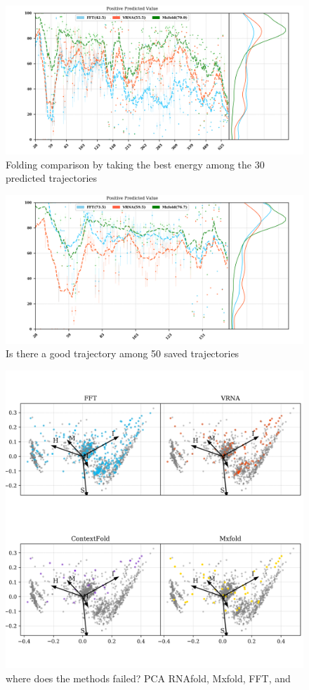 \documentclass[a4paper,12pt]{article}
\begin{document}
{{\begin{figure}[htbp]
\centering
\includegraphics[width=.9\linewidth]{img/comp_100n_30s_pvv.png}
\caption{Folding comparison by taking the best energy among the 30 predicted trajectories}
\end{figure}

\begin{figure}[htbp]
\centering
\includegraphics[width=.9\linewidth]{img/comp_max_50n_50_stacks.png}
\caption{Is there a good trajectory among 50 saved trajectories}
\end{figure}

\begin{figure}[htbp]
\centering
\includegraphics[width=.9\linewidth]{img/comp_fails.png}
\caption{where does the methods failed? PCA RNAfold, Mxfold, FFT, and}
\end{figure}

}}
\end{document}
